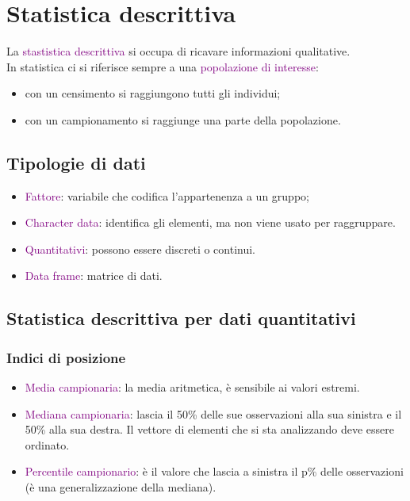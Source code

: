 \chapter{Statistica descrittiva}

La \textcolor{purple}{stastistica descrittiva} si occupa di ricavare informazioni qualitative. 
\\
In statistica ci si riferisce sempre a una \textcolor{purple}{popolazione di interesse}:
\begin{itemize}
    \item con un censimento si raggiungono tutti gli individui;
    \item con un campionamento si raggiunge una parte della popolazione.
\end{itemize}


\section{Tipologie di dati}

\begin{itemize}
    \item \textcolor{purple}{Fattore}: variabile che codifica l'appartenenza a un gruppo;
    \item \textcolor{purple}{Character data}: identifica gli elementi, ma non viene usato per raggruppare.
    \item \textcolor{purple}{Quantitativi}: possono essere discreti o continui.
    \item \textcolor{purple}{Data frame}: matrice di dati.
\end{itemize}

\section{Statistica descrittiva per dati quantitativi}

\subsection{Indici di posizione}

\begin{itemize}
    \item \textcolor{purple}{Media campionaria}: la media aritmetica, è sensibile ai valori estremi.
    \item \textcolor{purple}{Mediana campionaria}: lascia il 50\% delle sue osservazioni alla sua sinistra e il 50\% alla sua destra. Il vettore di elementi che si sta analizzando deve essere ordinato. 
    \item \textcolor{purple}{Percentile campionario}: è il valore che lascia a sinistra il p\% delle osservazioni (è una generalizzazione della mediana).
\end{itemize}

